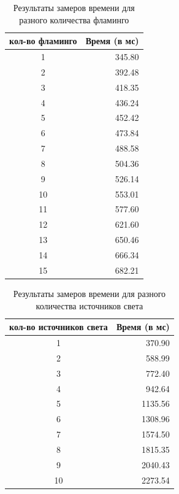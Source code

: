 \begin{table}[h]
	\begin{center}
	\captionsetup{justification=raggedright,singlelinecheck=off}
	\caption{Результаты замеров времени для разного количества фламинго}
	\label{tbl:time_flam}
	\begin{tabular}{|c|r|}
		\hline
		кол-во фламинго & Время (в мс) \\
		\hline
		1 & 345.80 \\ 
		\hline
		2 & 392.48 \\ 
		\hline
		3 & 418.35 \\ 
		\hline
		4 & 436.24 \\ 
		\hline
		5 & 452.42 \\ 
		\hline
		6 & 473.84 \\ 
		\hline
		7 & 488.58 \\ 
		\hline
		8 & 504.36 \\ 
		\hline
		9 & 526.14 \\ 
		\hline
		10 & 553.01 \\ 
		\hline
		11 & 577.60 \\ 
		\hline
		12 & 621.60 \\ 
		\hline
		13 & 650.46 \\ 
		\hline
		14 & 666.34 \\ 
		\hline
		15 & 682.21 \\ 
		\hline
	\end{tabular}
\end{center}
\end{table}

\begin{table}[h]
	\begin{center}
		\captionsetup{justification=raggedright,singlelinecheck=off}
		\caption{Результаты замеров времени для разного количества источников света}
		\label{tbl:time_lights}
		\begin{tabular}{|c|r|}
			\hline
			кол-во источников света & Время (в мс) \\
			\hline
			1 & 370.90 \\ 
			\hline
			2 & 588.99 \\ 
			\hline
			3 & 772.40 \\ 
			\hline
			4 & 942.64 \\ 
			\hline
			5 & 1135.56 \\ 
			\hline
			6 & 1308.96 \\ 
			\hline
			7 & 1574.50 \\ 
			\hline
			8 & 1815.35 \\ 
			\hline
			9 & 2040.43 \\ 
			\hline
			10 & 2273.54 \\ 
			\hline
		\end{tabular}
	\end{center}
\end{table}


